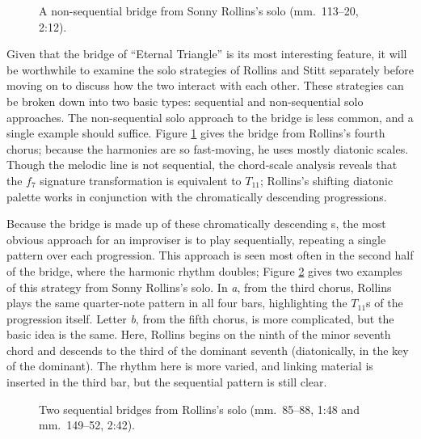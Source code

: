 \begin{figure}[tbp]
  \caption[A non-sequential bridge from Sonny Rollins's solo.]{%
    A non-sequential bridge from Sonny Rollins's solo (mm.~113--20, 2:12).}
  \label{et:sr-non-seq}
\end{figure}

Given that the bridge of ``Eternal Triangle'' is its most interesting feature,
it will be worthwhile to examine the solo strategies of Rollins and Stitt
separately before moving on to discuss how the two interact with each other.
These strategies can be broken down into two basic types: sequential and
non-sequential solo approaches. The non-sequential solo approach to the bridge
is less common, and a single example should suffice. Figure
\ref{et:sr-non-seq} gives the bridge from Rollins's fourth chorus;
because the harmonies are so fast-moving, he uses mostly diatonic scales.
Though the melodic line is not sequential, the chord-scale analysis reveals
that the $f_7$ signature transformation is equivalent to $T_{11}$; Rollins's
shifting diatonic palette works in conjunction with the chromatically
descending \tf progressions.

Because the bridge is made up of these chromatically descending \tf{}s, the most
obvious approach for an improviser is to play sequentially, repeating a single
pattern over each \tf progression. This approach is seen most often in the
second half of the bridge, where the harmonic rhythm doubles; Figure
\ref{et:sr-seq-bridge} gives two examples of this strategy from Sonny Rollins's
solo. In \emph{a}, from the third chorus, Rollins plays the same
quarter-note pattern in all four bars, highlighting the $T_{11}$s of the
progression itself. Letter \emph{b}, from the fifth chorus, is
more complicated, but the basic idea is the same. Here, Rollins begins on the
ninth of the minor seventh chord and descends to the third of the dominant
seventh (diatonically, in the key of the dominant). The rhythm here is more
varied, and linking material is inserted in the third bar, but the sequential
pattern is still clear.

\begin{figure}[tbp]
  \caption[Two sequential bridges from Rollins's solo.]{%
    Two sequential bridges from Rollins's solo (mm.~85--88, 1:48 and
    mm.~149--52, 2:42).}
  \label{et:sr-seq-bridge}
\end{figure}

